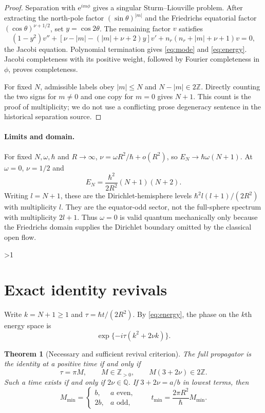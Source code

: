 \documentclass[10pt]{article}
\newcommand{\ZZ}{\mathbb Z}
\newcommand{\e}{\mathrm e}
\newtheorem{theorem}{Theorem}
\begin{document}
\begin{proof}
Separation with $\e^{im\phi}$ gives a singular Sturm--Liouville problem.
After extracting the north-pole factor $(\sin\theta)^{|m|}$ and the
Friedrichs equatorial factor $(\cos\theta)^{\nu+1/2}$, set
$y=\cos2\theta$.  The remaining factor $v$ satisfies
\begin{equation}
 (1-y^2)v''+[\nu-|m|-(|m|+\nu+2)y]v'
 +n_r(n_r+|m|+\nu+1)v=0,                     \label{eq:jacobi}
\end{equation}
the Jacobi equation.  Polynomial termination gives \eqref{eq:mode} and
\eqref{eq:energy}.  Jacobi completeness with its positive weight, followed
by Fourier completeness in $\phi$, proves completeness.

For fixed $N$, admissible labels obey $|m|\leq N$ and
$N-|m|\in2\ZZ$.  Directly counting the two signs for $m\ne0$ and one copy for
$m=0$ gives $N+1$.  This count is the proof of multiplicity; we do not use a
conflicting prose degeneracy sentence in the historical separation source.
\end{proof}

\paragraph{Limits and domain.}
For fixed $N,\omega,\hbar$ and $R\to\infty$,
$\nu=\omega R^2/\hbar+o(R^2)$, so
$E_N\to\hbar\omega(N+1)$.  At $\omega=0$, $\nu=1/2$ and
\[
 E_N=\frac{\hbar^2}{2R^2}(N+1)(N+2).
\]
Writing $l=N+1$, these are the Dirichlet-hemisphere levels
$\hbar^2l(l+1)/(2R^2)$ with multiplicity $l$.  They are the equator-odd
sector, not the full-sphere spectrum with multiplicity $2l+1$.  Thus
$\omega=0$ is valid quantum mechanically only because the Friedrichs domain
supplies the Dirichlet boundary omitted by the classical open flow.
\fi

\ifnum\CRevisionRound>1
\section{Exact identity revivals}
Write $k=N+1\geq1$ and $\tau=\hbar t/(2R^2)$.  By
\eqref{eq:energy}, the phase on the $k$th energy space is
\[
 \exp\{-i\tau(k^2+2\nu k)\}.
\]

\begin{theorem}[Necessary and sufficient revival criterion]
The full propagator is the identity at a positive time if and only if
\begin{equation}
 \tau=\pi M,\qquad M\in\ZZ_{>0},\qquad
 M(3+2\nu)\in2\ZZ.                            \label{eq:revival}
\end{equation}
Such a time exists if and only if $2\nu\in\mathbb Q$.  If
$3+2\nu=a/b$ in lowest terms, then
\[
 M_{\min}=\begin{cases}b,&a\text{ even},\\2b,&a\text{ odd},\end{cases}
 \qquad
 t_{\min}=\frac{2\pi R^2}{\hbar}M_{\min}.
\]
\end{theorem}
\end{document}
